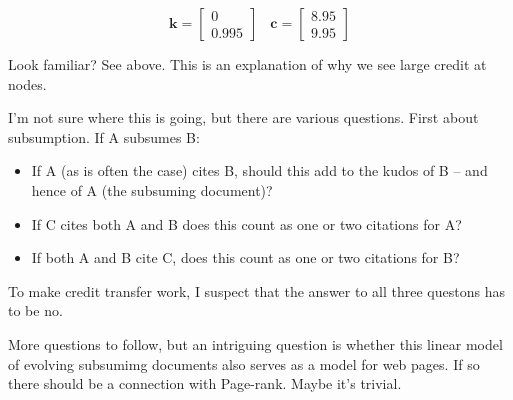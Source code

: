 \documentclass{article}
\newcommand{\cb}{\bm{c}}
\newcommand{\kb}{\bm{k}}
\begin{document}
\[ \kb = \left[\begin{array}{lc} 0\\0.995 \end{array}\right] \ \ \ \ \cb =
\left[\begin{array}{c} 8.95\\9.95 \end{array}\right] \]

Look familiar?   See above.  This is an explanation of why we see
large credit at nodes.

I'm not sure where this is going, but there are various questions.
First about subsumption. If A subsumes B:
\begin{itemize}
\item
If A (as is often the case)
cites B, should this add to the kudos of B -- and hence of A (the
subsuming document)?
\item If C cites both A and B does this count as one or two citations
  for A?
\item If both A and B cite C, does this count as one or two
    citations for B?
\end{itemize}
To make credit transfer work, I suspect that the answer to all three
questons has to be no.


More questions to follow, but an intriguing question is whether this
linear model of evolving subsumimg documents also serves as a model for web
pages.  If so there should be a connection with Page-rank.  Maybe it's
trivial.
\end{document}
